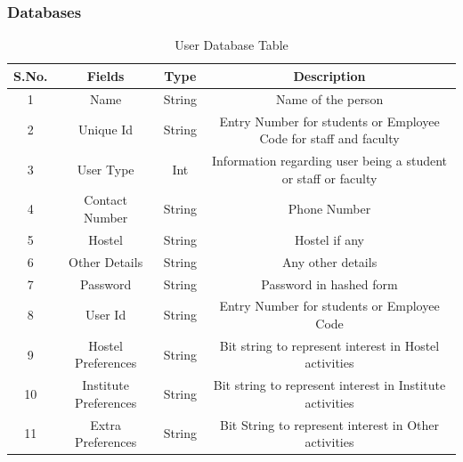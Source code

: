 \documentclass{article}
\begin{document}
					\subsubsection{Databases}
					\begin{table}[H]
\centering
\caption{User Database Table}
\label{my-label}
\begin{tabular}{|c|c|c|c|}
\hline
\textbf{S.No.} & \textbf{Fields} & \textbf{Type} & \textbf{Description}                                             \\ \hline
1              & Name            & String        & Name of the person                                               \\ \hline
2              & Unique Id       & String        & Entry Number for students or Employee Code for staff and faculty \\ \hline
3              & User Type       & Int           & Information regarding user being a student or staff or faculty   \\ \hline
4              & Contact Number  & String        & Phone Number                                                     \\ \hline
5              & Hostel          & String        & Hostel if any                                                    \\ \hline
6              & Other Details   & String        & Any other details                                                \\ \hline
7              & Password	 	 & String        & Password in hashed form                                          \\ \hline
8              & User Id                    & String        & Entry Number for students or Employee Code \\ \hline
9              & Hostel Preferences         & String        & Bit string to represent interest in Hostel activities            \\ \hline
10              & Institute Preferences & String        & Bit string to represent interest in Institute activities         \\ \hline
11             & Extra Preferences          & String        & Bit String to represent interest in Other activities             \\ \hline

\end{tabular}
\end{table}
\end{document}
